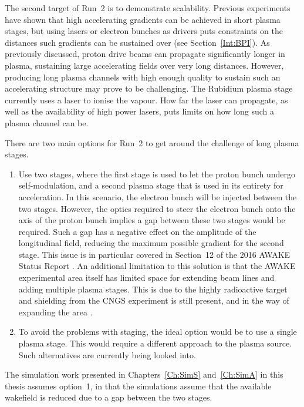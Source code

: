 The second target of Run~2 is to demonstrate scalability.
Previous experiments have shown that high accelerating gradients can be achieved in short plasma stages, but using lasers or electron bunches as drivers puts constraints on the distances such gradients can be sustained over (see Section~\ref{Int:BPI}).
As previously discussed, proton drive beams can propagate significantly longer in plasma, sustaining large accelerating fields over very long distances.
However, producing long plasma channels with high enough quality to sustain such an accelerating structure may prove to be challenging.
The Rubidium plasma stage currently uses a laser to ionise the vapour.
How far the laser can propagate, as well as the availability of high power lasers, puts limits on how long such a plasma channel can be.

There are two main options for Run~2 to get around the challenge of long plasma stages.
\begin{enumerate}
    \item Use two stages, where the first stage is used to let the proton bunch undergo self-modulation, and a second plasma stage that is used in its entirety for acceleration.
    In this scenario, the electron bunch will be injected between the two stages.
    However, the optics required to steer the electron bunch onto the axis of the proton bunch implies a gap between these two stages would be required.
    Such a gap has a negative effect on the amplitude of the longitudinal field, reducing the maximum possible gradient for the second stage.
    This issue is in particular covered in Section~12 of the 2016 AWAKE Status Report \cite{awake_collaboration:2016}.
    An additional limitation to this solution is that the AWAKE experimental area itself has limited space for extending beam lines and adding multiple plasma stages.
    This is due to the highly radioactive target and shielding from the CNGS experiment is still present, and in the way of expanding the area \cite{adli:2016a}.
    \item To avoid the problems with staging, the ideal option would be to use a single plasma stage.
    This would require a different approach to the plasma source.
    Such alternatives are currently being looked into.
\end{enumerate}

The simulation work presented in Chapters~\ref{Ch:SimS} and~\ref{Ch:SimA} in this thesis assumes option~1, in that the simulations assume that the available wakefield is reduced due to a gap between the two stages.

